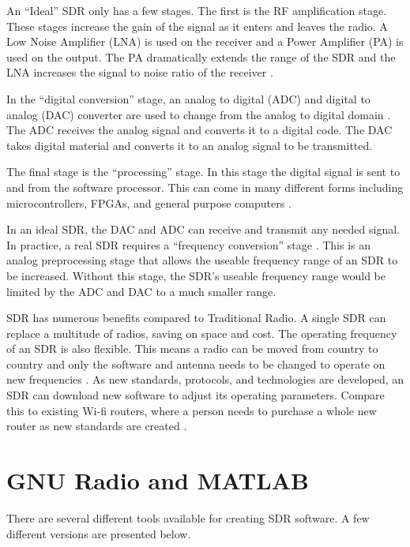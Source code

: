 An ``Ideal'' SDR only has a few stages. The first is the RF amplification stage. These stages increase the gain of the signal as it enters and leaves the radio. A Low Noise Amplifier (LNA) is used on the receiver and a Power Amplifier (PA) is used on the output. The PA dramatically extends the range of the SDR and the LNA increases the signal to noise ratio of the receiver \cite{761033}. 

In the ``digital conversion'' stage, an analog to digital (ADC) and digital to analog (DAC) converter are used to change from the analog to digital domain \cite{761033}\cite{0020}. The ADC receives the analog signal and converts it to a digital code. The DAC takes digital material and converts it to an analog signal to be transmitted. 

The final stage is the ``processing'' stage. In this stage the digital signal is sent to and from the software processor. This can come in many different forms including microcontrollers, FPGAs, and general purpose computers \cite{393001}\cite{0020}.  

In an ideal SDR, the DAC and ADC can receive and transmit any needed signal. In practice, a real SDR requires a ``frequency conversion'' stage \cite{393001} \cite{0020}. This is an analog preprocessing stage that allows the useable frequency range of an SDR to be increased. Without this stage, the SDR's useable frequency range would be limited by the ADC and DAC to a much smaller range. 

SDR has numerous benefits compared to Traditional Radio. A single SDR can replace a multitude of radios, saving on space and cost. The operating frequency of an SDR is also flexible. This means a radio can be moved from country to country and only the software and antenna needs to be changed to operate on new frequencies \cite{393001} \cite{0019}. As new standards, protocols, and technologies are developed, an SDR can download new software to adjust its operating parameters. Compare this to existing Wi-fi routers, where a person needs to purchase a whole new router as new standards are created \cite{761033} \cite{0019}. 


\section{GNU Radio and MATLAB}

There are several different tools available for creating SDR software. A few different versions are presented below. 

